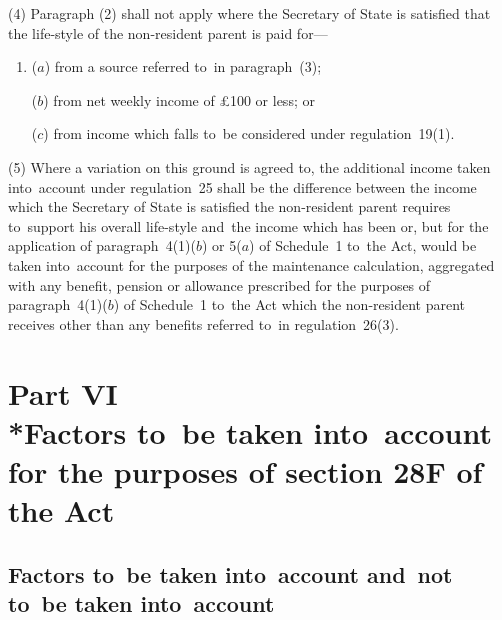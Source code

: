 \documentclass[12pt,a4paper]{article}
\begin{document}
(4) Paragraph (2) shall not apply where the Secretary of State is satisfied that the life-style of the non-resident parent is paid for—
\begin{enumerate}\item[]
($a$) from a source referred to~in paragraph~(3);

($b$) from net weekly income of £100 or less; or

($c$) from income which falls to~be considered under regulation~19(1).
\end{enumerate}

(5) Where a variation on this ground is agreed to, the additional income taken into~account under regulation~25 shall be the difference between the income which the Secretary of State is satisfied the non-resident parent requires to~support his overall life-style and~the income which has been or, but for the application of paragraph~4(1)($b$)  or 5($a$)  of Schedule~1 to~the Act, would be taken into~account for the purposes of the maintenance calculation, aggregated with any benefit, pension or allowance 
prescribed for the purposes of paragraph~4(1)($b$)  of Schedule~1 to~the Act  %
which the non-resident parent receives other than any benefits referred to~in regulation~26(3).


\section[Part VI --- Factors to~be taken into~account for the purposes of section 28F of the Act]{Part VI\\*Factors to~be taken into~account for the purposes of section 28F of the Act}

\renewcommand\parthead{--- Part VI}

\subsection[21. Factors to~be taken into~account and~not to~be taken into~account]{Factors to~be taken into~account and~not to~be taken into~account}
\end{document}
